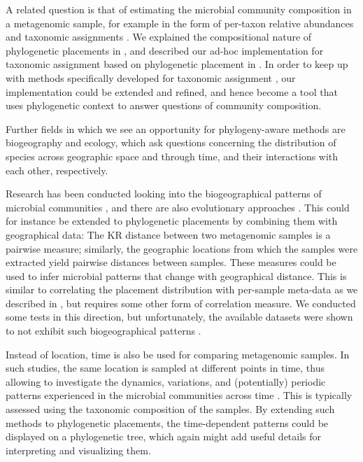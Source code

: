 A related question is that of estimating the microbial community composition in a metagenomic sample,
for example in the form of per-taxon relative abundances and taxonomic assignments \cite{Lindgreen2016}.
We explained the compositional nature of phylogenetic placements in
,
and described our ad-hoc implementation for taxonomic assignment based on phylogenetic placement in %
.
In order to keep up with methods specifically developed for taxonomic assignment
\cite{Lindgreen2016,Sczyrba2017,Almeida2018},
our implementation could be extended and refined,
and hence become a tool that uses phylogenetic context to answer questions of community composition.


Further fields in which we see an opportunity for phylogeny-aware methods are biogeography and ecology,
which ask questions concerning the distribution of species across geographic space and through time,
and their interactions with each other, respectively.

Research has been conducted looking into the biogeographical patterns of microbial communities
\cite{HughesMartiny2006}, and there are also evolutionary approaches \cite{Cox2016}.
This could for instance be extended to phylogenetic placements by combining them with geographical data:
The KR distance between two metagenomic samples is a pairwise measure;
similarly, the geographic locations from which the samples were extracted yield pairwise distances between samples.
These measures could be used to infer microbial patterns that change with geographical distance.
This is similar to correlating the placement distribution with per-sample meta-data
as we described in ,
but requires some other form of correlation measure.
We conducted some tests in this direction, but unfortunately,
the available datasets were shown to not exhibit such biogeographical patterns \cite{Lentendu2018}.

Instead of location, time is also be used for comparing metagenomic samples.
In such studies, the same location is sampled at different points in time,
thus allowing to investigate the dynamics, variations, and (potentially) periodic patterns
experienced in the microbial communities across time \cite{Costello2009,Faust2015}.
This is typically assessed using the taxonomic composition of the samples.
By extending such methods to phylogenetic placements,
the time-dependent patterns could be displayed on a phylogenetic tree,
which again might add useful details for interpreting and visualizing them.

